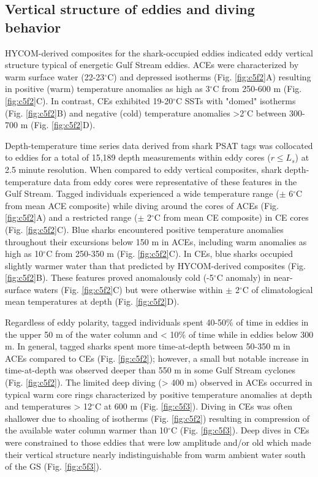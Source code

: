\subsection{Vertical structure of eddies and diving behavior}

HYCOM-derived composites for the shark-occupied eddies indicated eddy vertical structure typical of energetic Gulf Stream eddies. ACEs were characterized by warm surface water (22-23$^\circ$C) and depressed isotherms (Fig. \cref{fig:c5f2}A) resulting in positive (warm) temperature anomalies as high as 3$^\circ$C from 250-600 m (Fig. \cref{fig:c5f2}C). In contrast, CEs exhibited 19-20$^\circ$C SSTs with "domed" isotherms (Fig. \cref{fig:c5f2}B) and negative (cold) temperature anomalies >2$^\circ$C between 300-700 m (Fig. \cref{fig:c5f2}D).

Depth-temperature time series data derived from shark PSAT tags was collocated to eddies for a total of 15,189 depth measurements within eddy cores ($r \leq L_s$) at 2.5 minute resolution. When compared to eddy vertical composites, shark depth-temperature data from eddy cores were representative of these features in the Gulf Stream. Tagged individuals experienced a wide temperature range ($\pm$ 6$^\circ$C from mean ACE composite) while diving around the cores of ACEs (Fig. \cref{fig:c5f2}A) and a restricted range ($\pm$ 2$^\circ$C from mean CE composite) in CE cores (Fig. \cref{fig:c5f2}C). Blue sharks encountered positive temperature anomalies throughout their excursions below 150 m in ACEs, including warm anomalies as high as 10$^\circ$C from 250-350 m (Fig. \cref{fig:c5f2}C). In CEs, blue sharks occupied slightly warmer water than that predicted by HYCOM-derived composites (Fig. \cref{fig:c5f2}B). These features proved anomalously cold (-5$^\circ$C anomaly) in near-surface waters (Fig. \cref{fig:c5f2}C) but were otherwise within $\pm$ 2$^\circ$C of climatological mean temperatures at depth (Fig. \cref{fig:c5f2}D). 

Regardless of eddy polarity, tagged individuals spent 40-50\% of time in eddies in the upper 50 m of the water column and < 10\% of time while in eddies below 300 m. In general, tagged sharks spent more time-at-depth between 50-350 m in ACEs compared to CEs (Fig. \cref{fig:c5f2}); however, a small but notable increase in time-at-depth was observed deeper than 550 m in some Gulf Stream cyclones (Fig. \cref{fig:c5f2}). The limited deep diving (> 400 m) observed in ACEs occurred in typical warm core rings characterized by positive temperature anomalies at depth and temperatures > 12$^\circ$C at 600 m (Fig. \cref{fig:c5f3}). Diving in CEs was often shallower due to shoaling of isotherms (Fig. \cref{fig:c5f2}) resulting in compression of the available water column warmer than 10$^\circ$C (Fig. \cref{fig:c5f3}). Deep dives in CEs were constrained to those eddies that were low amplitude and/or old which made their vertical structure nearly indistinguishable from warm ambient water south of the GS (Fig. \cref{fig:c5f3}).


